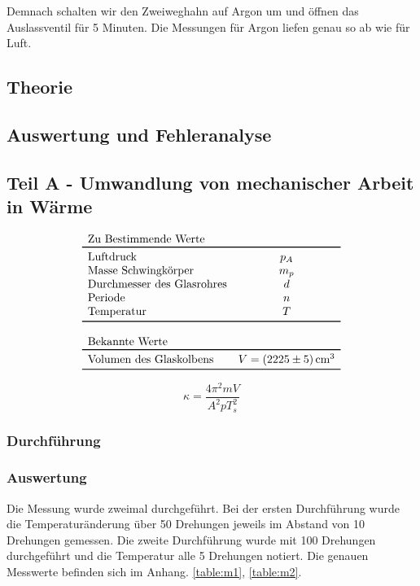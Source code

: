 \documentclass[11pt,a4paper]{article}
\begin{document}
Demnach schalten wir den Zweiweghahn auf Argon um und öffnen das Auslassventil für 5 Minuten. Die Messungen für Argon liefen genau so ab wie für Luft. 

\subsection{Theorie}



\subsection{Auswertung und Fehleranalyse}

\subsection{Teil A - Umwandlung von mechanischer Arbeit in Wärme }
$$
\begin{array}{lc}
	\multicolumn{1}{l}{\textrm{Zu Bestimmende Werte}} \\
	\toprule 
	\textrm{Luftdruck} & p_A \\
	\textrm{Masse Schwingkörper} & m_{p} \\
	\textrm{Durchmesser des Glasrohres} & d\\
	\textrm{Periode} & n \\
	\textrm{Temperatur} & T\\
	\bottomrule \\
	\multicolumn{2}{l}{\textrm{Bekannte Werte}} \\
	\toprule
	\textrm{Volumen des Glaskolbens} & V = (2225 \pm 5)\,\textrm{cm}^3\\
	\bottomrule 
\end{array}
$$

\begin{equation}\tag{F1}
	\kappa = \frac{4 \pi^2 mV}{A^2 p T^2_s}
	\label{F:0}
\end{equation}
\subsubsection{Durchf\"uhrung}



\subsubsection{Auswertung}

Die Messung wurde zweimal durchgef\"uhrt. Bei der ersten Durchf\"uhrung wurde die Temperatur\"anderung \"uber 50 Drehungen jeweils im Abstand von 10 Drehungen gemessen. Die zweite Durchf\"uhrung wurde mit 100 Drehungen durchgef\"uhrt und die Temperatur alle 5 Drehungen notiert. Die genauen Messwerte befinden sich im Anhang. \ref{table:m1}, \ref{table:m2}.
\end{document}
